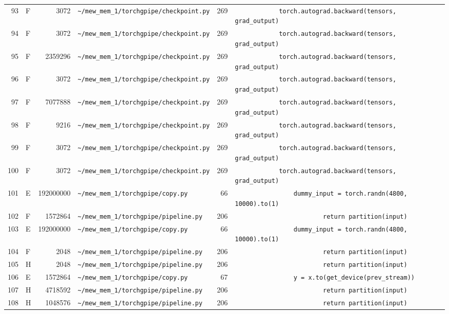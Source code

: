 \documentclass{article}
\begin{document}
\begin{longtable}{r l r p{6.5cm} r p{7.0cm}}
93 & F & 3072 & \lstinline|~/mew_mem_1/torchgpipe/checkpoint.py| & 269 & \lstinline|            torch.autograd.backward(tensors, grad_output)| \\
94 & F & 3072 & \lstinline|~/mew_mem_1/torchgpipe/checkpoint.py| & 269 & \lstinline|            torch.autograd.backward(tensors, grad_output)| \\
95 & F & 2359296 & \lstinline|~/mew_mem_1/torchgpipe/checkpoint.py| & 269 & \lstinline|            torch.autograd.backward(tensors, grad_output)| \\
96 & F & 3072 & \lstinline|~/mew_mem_1/torchgpipe/checkpoint.py| & 269 & \lstinline|            torch.autograd.backward(tensors, grad_output)| \\
97 & F & 7077888 & \lstinline|~/mew_mem_1/torchgpipe/checkpoint.py| & 269 & \lstinline|            torch.autograd.backward(tensors, grad_output)| \\
98 & F & 9216 & \lstinline|~/mew_mem_1/torchgpipe/checkpoint.py| & 269 & \lstinline|            torch.autograd.backward(tensors, grad_output)| \\
99 & F & 3072 & \lstinline|~/mew_mem_1/torchgpipe/checkpoint.py| & 269 & \lstinline|            torch.autograd.backward(tensors, grad_output)| \\
100 & F & 3072 & \lstinline|~/mew_mem_1/torchgpipe/checkpoint.py| & 269 & \lstinline|            torch.autograd.backward(tensors, grad_output)| \\
101 & E & 192000000 & \lstinline|~/mew_mem_1/torchgpipe/copy.py| & 66 & \lstinline|                dummy_input = torch.randn(4800, 10000).to(1)| \\
102 & F & 1572864 & \lstinline|~/mew_mem_1/torchgpipe/pipeline.py| & 206 & \lstinline|                        return partition(input)| \\
103 & E & 192000000 & \lstinline|~/mew_mem_1/torchgpipe/copy.py| & 66 & \lstinline|                dummy_input = torch.randn(4800, 10000).to(1)| \\
104 & F & 2048 & \lstinline|~/mew_mem_1/torchgpipe/pipeline.py| & 206 & \lstinline|                        return partition(input)| \\
105 & H & 2048 & \lstinline|~/mew_mem_1/torchgpipe/pipeline.py| & 206 & \lstinline|                        return partition(input)| \\
106 & E & 1572864 & \lstinline|~/mew_mem_1/torchgpipe/copy.py| & 67 & \lstinline|                y = x.to(get_device(prev_stream))| \\
107 & H & 4718592 & \lstinline|~/mew_mem_1/torchgpipe/pipeline.py| & 206 & \lstinline|                        return partition(input)| \\
108 & H & 1048576 & \lstinline|~/mew_mem_1/torchgpipe/pipeline.py| & 206 & \lstinline|                        return partition(input)| \\
\end{longtable}
\end{document}
